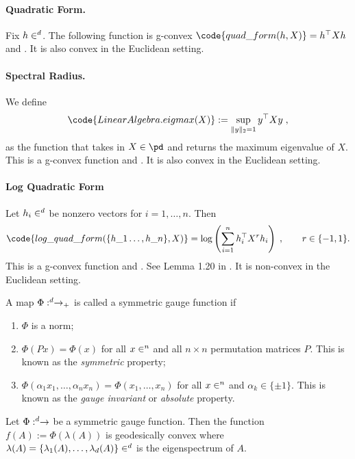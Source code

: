 \documentclass[twoside,11pt]{article}
\begin{document}
\paragraph{Quadratic Form.}
Fix $h \in \real^d$. The following function is g-convex $\code{quad\_form(h, X)} = h^\top X h$ and . It is also convex in the Euclidean setting. 


\paragraph{Spectral Radius.} We define
\[\code{LinearAlgebra.eigmax(X)} := \sup_{\|y\|_2 = 1}y^\top X y  \; ,\]
as the function that takes in $X \in \pd$ and returns the maximum eigenvalue of $X$. This is a g-convex function and . It is also convex in the Euclidean setting.


\paragraph{Log Quadratic Form}

 Let $h_i \in \real^d$ be nonzero vectors for $i = 1, \ldots, n$. Then  
\[
\code{log\_quad\_form(\{h\_1 \ldots, h\_n\}, X)} = \log \left(\sum_{i=1}^n h_i^\top X^{r} h_i \right) \; , \qquad r \in \{-1, 1\}.
\]
This is a g-convex function and . See Lemma 1.20 in \citep{wieselstructuredcovariance}. It is non-convex in the Euclidean setting.


\begin{definition} 
     A map $\Phi:\real^d \to \real_+$ is called a symmetric gauge function if 
    \begin{enumerate}
        \item $\Phi$ is a norm;
        \item $\Phi(Px) = \Phi(x)$ for all $x \in \real^n$ and all $n\times n$ permutation matrices $P$. This is known as the \textit{symmetric} property;
        \item $\Phi(\alpha_1 x_1, \ldots, \alpha_n x_n) = \Phi(x_1, \ldots, x_n)$ for all $x \in \real^n$ and $\alpha_k \in \{\pm 1\}$. This is known as the \textit{gauge invariant} or \textit{absolute} property.
    \end{enumerate}
\end{definition}

\begin{prop}\label{prop:sgf_gvx}
 Let $\Phi: \real^d \to \real$ be a symmetric gauge function. Then the function  $f(A) := \Phi(\lambda(A))$ is geodesically convex where $\lambda(A) = \{\lambda_1(A), \ldots, \lambda_d(A)\} \in \real^d$ is the eigenspectrum of $A$.
\end{prop}
\end{document}
